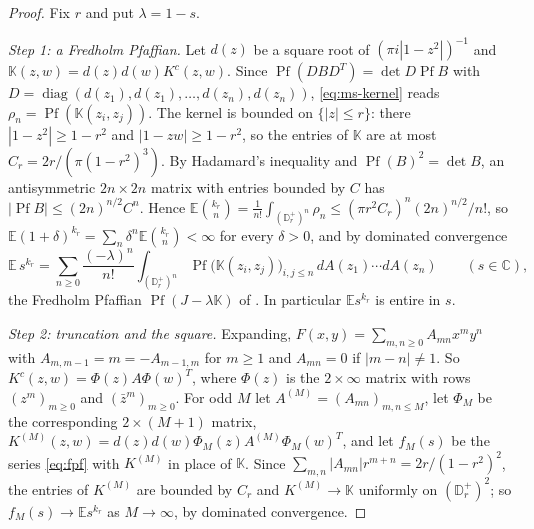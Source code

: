 \documentclass[11pt]{amsart}
\theoremstyle{definition}
\theoremstyle{remark}
\numberwithin{equation}{section}
\newcommand{\C}{\mathbb{C}}
\newcommand{\D}{\mathbb{D}}
\newcommand{\E}{\mathbb{E}}
\begin{document}
\begin{proof}
Fix $r$ and put $\lambda=1-s$.

\emph{Step 1: a Fredholm Pfaffian.} Let $d(z)$ be a square root of $(\pi i|1-z^2|)^{-1}$ and $\mathbb K(z,w)=d(z)d(w)K^c(z,w)$. Since $\operatorname{Pf}(DBD^T)=\det D\operatorname{Pf}B$ with $D=\operatorname{diag}(d(z_1),d(z_1),\dots,d(z_n),d(z_n))$, \eqref{eq:ms-kernel} reads $\rho_n=\operatorname{Pf}(\mathbb K(z_i,z_j))$. The kernel is bounded on $\{|z|\le r\}$: there $|1-z^2|\ge1-r^2$ and $|1-zw|\ge1-r^2$, so the entries of $\mathbb K$ are at most $C_r=2r/(\pi(1-r^2)^3)$. By Hadamard's inequality and $\operatorname{Pf}(B)^2=\det B$, an antisymmetric $2n\times2n$ matrix with entries bounded by $C$ has $|\operatorname{Pf}B|\le(2n)^{n/2}C^n$. Hence $\E\binom{k_r}n=\frac1{n!}\int_{(\D_r^+)^n}\rho_n\le(\pi r^2C_r)^n(2n)^{n/2}/n!$, so $\E(1+\delta)^{k_r}=\sum_n\delta^n\E\binom{k_r}n<\infty$ for every $\delta>0$, and by dominated convergence
\begin{equation}\label{eq:fpf}
\E\,s^{k_r}=\sum_{n\ge0}\frac{(-\lambda)^n}{n!}\int_{(\D_r^+)^n}\operatorname{Pf}\bigl(\mathbb K(z_i,z_j)\bigr)_{i,j\le n}\,dA(z_1)\cdots dA(z_n)\qquad(s\in\C),
\end{equation}
the Fredholm Pfaffian $\operatorname{Pf}(J-\lambda\mathbb K)$ of \cite[(8.3)]{Ra}. In particular $\E s^{k_r}$ is entire in $s$.

\emph{Step 2: truncation and the square.} Expanding, $F(x,y)=\sum_{m,n\ge0}A_{mn}x^my^n$ with $A_{m,m-1}=m=-A_{m-1,m}$ for $m\ge1$ and $A_{mn}=0$ if $|m-n|\ne1$. So $K^c(z,w)=\Phi(z)A\Phi(w)^T$, where $\Phi(z)$ is the $2\times\infty$ matrix with rows $(z^m)_{m\ge0}$ and $(\bar z^m)_{m\ge0}$. For odd $M$ let $A^{(M)}=(A_{mn})_{m,n\le M}$, let $\Phi_M$ be the corresponding $2\times(M+1)$ matrix, $K^{(M)}(z,w)=d(z)d(w)\Phi_M(z)A^{(M)}\Phi_M(w)^T$, and let $f_M(s)$ be the series \eqref{eq:fpf} with $K^{(M)}$ in place of $\mathbb K$. Since $\sum_{m,n}|A_{mn}|r^{m+n}=2r/(1-r^2)^2$, the entries of $K^{(M)}$ are bounded by $C_r$ and $K^{(M)}\to\mathbb K$ uniformly on $(\D_r^+)^2$; so $f_M(s)\to\E s^{k_r}$ as $M\to\infty$, by dominated convergence.


\end{proof}
\end{document}
